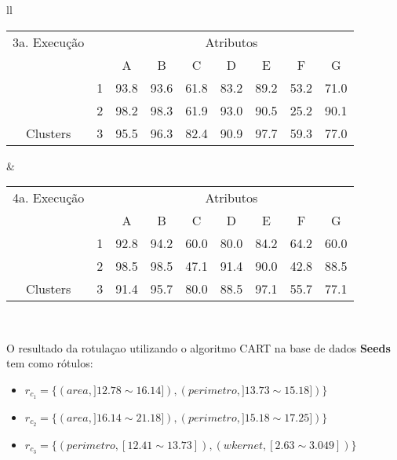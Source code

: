 \begin{table}[!h]
\begin{tabular}{ll}
   \small\addtolength{\tabcolsep}{-5pt}
   \begin{tabular}{|cl|c|c|c|c|c|c|c|}
        \hline \hline
          {\tiny  3a. Execução}   &   & \multicolumn{7}{c|}{Atributos}                                               \\ \cline{3-9} 
       \multicolumn{1}{|l}{}                            &   & A    & B & C & D & E & F & G \\ \hline
        \multicolumn{1}{|c|}{}                           & 1 & 93.8 & 93.6   & 61.8      & 83.2 & 89.2 & 53.2   & 71.0   \\ \cline{2-9} 
        \multicolumn{1}{|c|}{}                           & 2 & 98.2 & 98.3   & 61.9      & 93.0 & 90.5 & 25.2  & 90.1  \\ \cline{2-9} 
        \multicolumn{1}{|c|}{\multirow{-3}{*}{Clusters}} & 3 & 95.5 & 96.3   & 82.4      & 90.9 & 97.7 & 59.3  & 77.0  \\ \hline
   \end{tabular}
    
    &
    
       \small\addtolength{\tabcolsep}{-5pt}
   \begin{tabular}{|cl|c|c|c|c|c|c|c|}
        \hline \hline
         {\tiny 4a. Execução}       &   & \multicolumn{7}{c|}{Atributos}                                               \\ \cline{3-9} 
       \multicolumn{1}{|l}{}                            &   & A    & B & C & D & E & F & G \\ \hline
        \multicolumn{1}{|c|}{}                           & 1 & 92.8 & 94.2   & 60.0      & 80.0 & 84.2 & 64.2   & 60.0   \\ \cline{2-9} 
        \multicolumn{1}{|c|}{}                           & 2 & 98.5 & 98.5   & 47.1      & 91.4 & 90.0 & 42.8  & 88.5  \\ \cline{2-9} 
        \multicolumn{1}{|c|}{\multirow{-3}{*}{Clusters}} & 3 & 91.4 & 95.7   & 80.0      & 88.5 & 97.1 & 55.7  & 77.1  \\ \hline
   \end{tabular}
   \\
 
 \end{tabular}
 \label{tab:execucoes:seed:cart}
\end{table}

O resultado da rotulaçao utilizando o algoritmo CART na base de dados \textbf{Seeds} tem como rótulos: 
\begin{itemize}[noitemsep]
 \item ${r_{c_1}=\{ (area, ]12.78 \sim 16.14]), (perimetro, ]13.73 \sim 15.18]) \} }$
 \item ${r_{c_2}=\{ (area, ]16.14 \sim 21.18]), (perimetro, ]15.18 \sim 17.25]) \} }$
 \item ${r_{c_3}=\{ (perimetro, [12.41 \sim 13.73]),  (wkernet, [2.63 \sim 3.049]) \} }$
\end{itemize}


